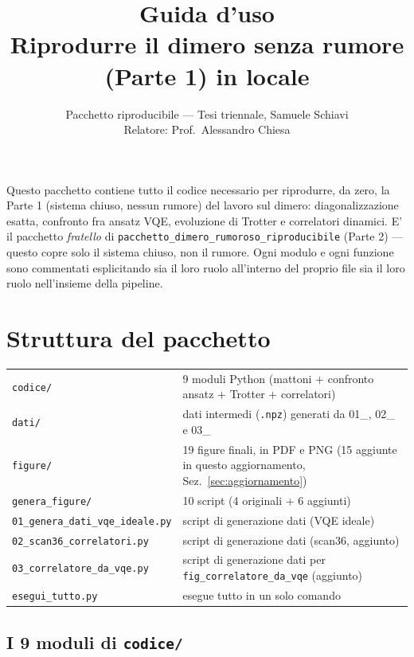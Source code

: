 \documentclass[11pt,a4paper]{article}
\title{\vspace{-1.5em}\color{inkblue}Guida d'uso\\[0.2em]
\Large\normalfont\color{softgray}Riprodurre il dimero senza rumore (Parte 1) in locale}
\author{Pacchetto riproducibile --- Tesi triennale, Samuele Schiavi\\ Relatore: Prof.\ Alessandro Chiesa}
\date{}
\newcommand{\code}[1]{\texttt{\small #1}}
\begin{document}
\sloppy
\maketitle
\thispagestyle{fancy}
\vspace{-2.0em}

Questo pacchetto contiene tutto il codice necessario per riprodurre, da
zero, la Parte 1 (sistema chiuso, nessun rumore) del lavoro sul dimero:
diagonalizzazione esatta, confronto fra ansatz VQE, evoluzione di
Trotter e correlatori dinamici. E' il pacchetto \emph{fratello} di
\code{pacchetto\_dimero\_rumoroso\_riproducibile} (Parte 2) --- questo
copre solo il sistema chiuso, non il rumore. Ogni modulo e ogni funzione
sono commentati esplicitando sia il loro ruolo all'interno del proprio
file sia il loro ruolo nell'insieme della pipeline.

\tableofcontents

\section{Struttura del pacchetto}

\begin{keyeq}
\centering
\begin{tabular}{@{}lp{9.5cm}@{}}
\code{codice/} & 9 moduli Python (mattoni + confronto ansatz + Trotter + correlatori)\\
\code{dati/} & dati intermedi (\code{.npz}) generati da 01\_, 02\_ e 03\_\\
\code{figure/} & 19 figure finali, in PDF e PNG (15 aggiunte in questo aggiornamento, Sez.~\ref{sec:aggiornamento})\\
\code{genera\_figure/} & 10 script (4 originali + 6 aggiunti)\\
\code{01\_genera\_dati\_vqe\_ideale.py} & script di generazione dati (VQE ideale)\\
\code{02\_scan36\_correlatori.py} & script di generazione dati (scan36, aggiunto)\\
\code{03\_correlatore\_da\_vqe.py} & script di generazione dati per \code{fig\_correlatore\_da\_vqe} (aggiunto)\\
\code{esegui\_tutto.py} & esegue tutto in un solo comando\\
\end{tabular}
\end{keyeq}

\subsection{I 9 moduli di \texttt{codice/}}
\end{document}
